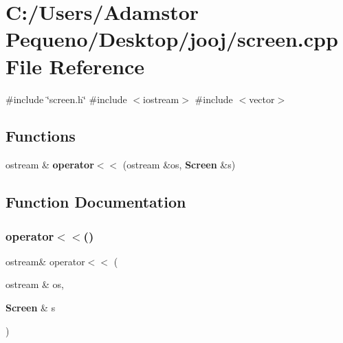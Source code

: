 \section{C\+:/\+Users/\+Adamstor Pequeno/\+Desktop/jooj/screen.cpp File Reference}
\label{screen_8cpp}
{\ttfamily \#include \char`\"{}screen.\+h\char`\"{}}\newline
{\ttfamily \#include $<$iostream$>$}\newline
{\ttfamily \#include $<$vector$>$}\newline
\subsection*{Functions}
\begin{DoxyCompactItemize}
\item 
ostream \& \textbf{ operator$<$$<$} (ostream \&os, \textbf{ Screen} \&s)
\end{DoxyCompactItemize}


\subsection{Function Documentation}
\mbox{\label{screen_8cpp_a268c62adce6622ae84fb457a44d74bfd}} 
\subsubsection{operator$<$$<$()}
{\footnotesize\ttfamily ostream\& operator$<$$<$ (\begin{DoxyParamCaption}\item[{ostream \&}]{os,  }\item[{\textbf{ Screen} \&}]{s }\end{DoxyParamCaption})}


